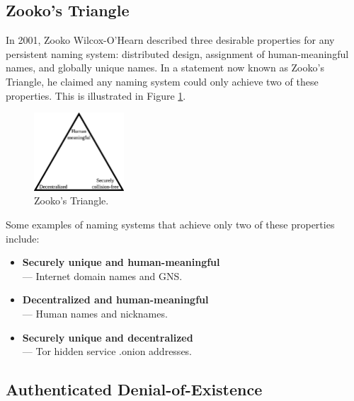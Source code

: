 \documentclass{sig-alternate}
\begin{document}
\newpage

\subsection{Zooko's Triangle}

In 2001, Zooko Wilcox-O'Hearn described three desirable properties for any persistent naming system: distributed design, assignment of human-meaningful names, and globally unique names. In a statement now known as Zooko's Triangle,\cite{ferdous2009security}\cite{stiegler2005petname} he claimed any naming system could only achieve two of these properties. This is illustrated in Figure \ref{fig:ZookosTriangle}.

\begin{figure}[htbp]
	\centering
	\includegraphics[width=0.3\textwidth]{../images/Zooko.eps}
	\caption{Zooko's Triangle.}
	\label{fig:ZookosTriangle}
\end{figure}

Some examples of naming systems that achieve only two of these properties include:

\begin{itemize}[noitemsep]
	\item \textbf{Securely unique and human-meaningful} \\ --- Internet domain names and GNS.
	\item \textbf{Decentralized and human-meaningful} \\ --- Human names and nicknames.
	\item \textbf{Securely unique and decentralized} \\ --- Tor hidden service .onion addresses.
\end{itemize}


\subsection{Authenticated Denial-of-Existence}
\end{document}

